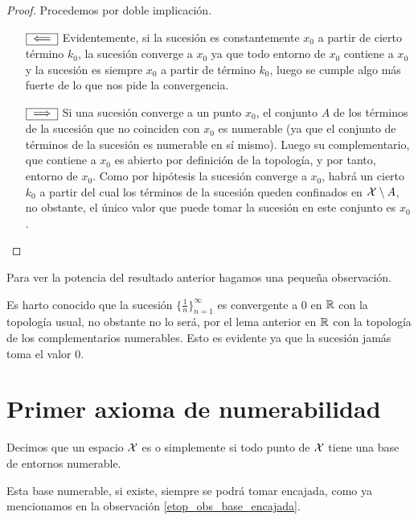 \begin{proof}Procedemos por doble implicación.
	\begin{enumerate}
		\item[$\fbox{$\impliedby$}$] 
		Evidentemente, si la sucesión es constantemente $x_0$ a partir de cierto término $k_0$, la sucesión converge a $x_0$ ya que todo entorno de $x_0$ contiene a $x_0$ y la sucesión es siempre $x_0$ a partir de término $k_0$, luego se cumple algo más fuerte de lo que nos pide la convergencia.
		\item[$\fbox{$\implies$}$]
		Si una sucesión converge a un punto $x_0$, el conjunto $A$ de los términos de la sucesión que no coinciden con $x_0$ es numerable (ya que el conjunto de términos de la sucesión es numerable en sí mismo). Luego su complementario, que contiene a $x_0$ es abierto por definición de la topología, y por tanto, entorno de $x_0$. Como por hipótesis la sucesión converge a $x_0$, habrá un cierto $k_0$ a partir del cual los términos de la sucesión queden confinados en $\mathcal{X}\setminus A$, no obstante, el único valor que puede tomar la sucesión en este conjunto es $x_0$.\qedhere
	\end{enumerate}
\end{proof}
Para ver la potencia del resultado anterior hagamos una pequeña observación.
\begin{obs}
	Es harto conocido que la sucesión $\{\frac{1}{n}\}_{n=1}^{\infty}$ es convergente a $0$ en $\mathbb{R}$ con la topología usual, no obstante no lo será, por el lema anterior en $\mathbb{R}$ con la topología de los complementarios numerables. Esto es evidente ya que la sucesión jamás toma el valor $0$.
\end{obs}
\section{Primer axioma de numerabilidad}

\begin{defi}
	Decimos que un espacio $\mathcal{X}$ es  o simplemente  si todo punto de $\mathcal{X}$ tiene una base de entornos numerable.
\end{defi}

\begin{obs}
	Esta base numerable, si existe, siempre se podrá tomar encajada, como ya mencionamos en la observación \ref{etop_obs_base_encajada}. 
\end{obs}

